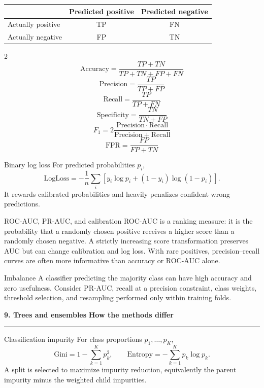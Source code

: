 \documentclass[10pt,a4paper]{article}
\newcommand{\sectionbanner}[2]{%
  \vspace{2mm}
  {\color{navy}\Large\bfseries #1}\hfill
  {\color{blue}\bfseries #2}
  \par\vspace{1mm}\color{line}\rule{\linewidth}{0.8pt}\color{ink}\vspace{2mm}
}
\newcommand{\subbanner}[1]{%
  \vspace{2mm}{\color{navy}\large\bfseries #1}\par
  \vspace{-1mm}{\color{line}\rule{\linewidth}{0.5pt}}\color{ink}\vspace{1mm}
}
\begin{document}
\subbanner{Binary classification}

\begin{center}
\begin{tabular}{lcc}
\toprule
 & Predicted positive & Predicted negative \\
\midrule
Actually positive & TP & FN \\
Actually negative & FP & TN \\
\bottomrule
\end{tabular}
\end{center}

\begin{multicols}{2}
\[
\mathrm{Accuracy}=\frac{TP+TN}{TP+TN+FP+FN}
\]
\[
\mathrm{Precision}=\frac{TP}{TP+FP}
\]
\[
\mathrm{Recall}=\frac{TP}{TP+FN}
\]
\[
\mathrm{Specificity}=\frac{TN}{TN+FP}
\]
\[
F_1=2\frac{\mathrm{Precision}\cdot\mathrm{Recall}}
{\mathrm{Precision}+\mathrm{Recall}}
\]
\[
\mathrm{FPR}=\frac{FP}{FP+TN}
\]
\end{multicols}

\begin{formulabox}{Binary log loss}
For predicted probabilities $p_i$,
\[
\mathrm{LogLoss}=-\frac1n\sum_i\left[y_i\log p_i+(1-y_i)\log(1-p_i)\right].
\]
It rewards calibrated probabilities and heavily penalizes confident wrong predictions.
\end{formulabox}

\begin{keybox}{ROC-AUC, PR-AUC, and calibration}
ROC-AUC is a ranking measure: it is the probability that a randomly chosen positive receives a higher score than a randomly chosen negative. A strictly increasing score transformation preserves AUC but can change calibration and log loss. With rare positives, precision--recall curves are often more informative than accuracy or ROC-AUC alone.
\end{keybox}

\begin{trapbox}{Imbalance}
A classifier predicting the majority class can have high accuracy and zero usefulness. Consider PR-AUC, recall at a precision constraint, class weights, threshold selection, and resampling performed only within training folds.
\end{trapbox}

\sectionbanner{9. Trees and ensembles}{How the methods differ}

\begin{formulabox}{Classification impurity}
For class proportions $p_1,\ldots,p_K$,
\[
\mathrm{Gini}=1-\sum_{k=1}^{K}p_k^2,
\qquad
\mathrm{Entropy}=-\sum_{k=1}^{K}p_k\log p_k.
\]
A split is selected to maximize impurity reduction, equivalently the parent impurity minus the weighted child impurities.
\end{formulabox}
\end{document}
